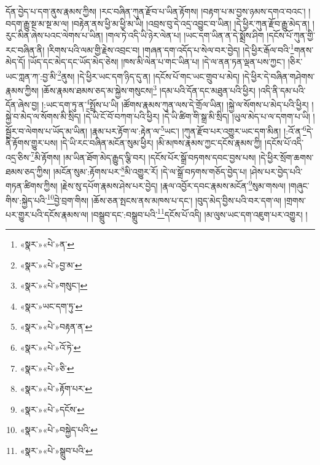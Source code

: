 དོན་བྱེད་པ་དག་ནུས་རྣམས་ཀྱིས། །རང་བཞིན་ཀུན་རྫོབ་པ་ཡིན་རྟོགས། །བརྟག་པ་མ་བྱས་ཉམས་དགའ་བའང་། །བདག་རྒྱུ་སྔ་མ་སྔ་མ་ལ། །བརྟེན་ནས་ཕྱི་མ་ཕྱི་མ་ཡི། །འབྲས་བུ་དེ་འདྲ་འབྱུང་བ་ཡིན། །དེ་ཕྱིར་ཀུན་རྫོབ་རྒྱུ་མེད་ན། །རུང་མིན་ཞེས་པའང་ལེགས་པ་ཡིན། །གལ་ཏེ་འདི་ཡི་ཉེར་ལེན་པ། །ཡང་དག་ཡིན་ན་དེ་སྨྲོས་ཤིག །དངོས་པོ་ཀུན་གྱི་རང་བཞིན་ནི། །རིགས་པའི་ལམ་གྱི་རྗེས་འབྲང་བ། །གཞན་དག་འདོད་པ་སེལ་བར་བྱེད། །དེ་ཕྱིར་རྒོལ་བའི་\footnote{«སྣར་»«པེ་»ན་}གནས་མེད་དོ། །ཡོད་དང་མེད་དང་ཡོད་མེད་ཅེས། །ཁས་མི་ལེན་པ་གང་ཡིན་པ། །དེ་ལ་ནན་ཏན་ལྡན་པས་ཀྱང་། །ཅིར་ཡང་ཀླན་ཀ་:བྱ་མི་\footnote{«སྣར་»«པེ་»བྱ་མ་}ནུས། །དེ་ཕྱིར་ཡང་དག་ཉིད་དུ་ན། །དངོས་པོ་གང་ཡང་གྲུབ་པ་མེད། །དེ་ཕྱིར་དེ་བཞིན་གཤེགས་རྣམས་ཀྱིས། །ཆོས་རྣམས་ཐམས་ཅད་མ་སྐྱེས་གསུངས།\footnote{«སྣར་»«པེ་»གསུང་།} །དམ་པའི་དོན་དང་མཐུན་པའི་ཕྱིར། །འདི་ནི་དམ་པའི་དོན་ཞེས་བྱ། །:ཡང་དག་ཏུ་ན་\footnote{«སྣར་»ཡང་དག་ཏུ་}སྤྲོས་པ་ཡི། །ཚོགས་རྣམས་ཀུན་ལས་དེ་གྲོལ་ཡིན། །སྐྱེ་ལ་སོགས་པ་མེད་པའི་ཕྱིར། །སྐྱེ་བ་མེད་ལ་སོགས་མི་སྲིད། །དེ་ཡི་ངོ་བོ་བཀག་པའི་ཕྱིར། །དེ་ཡི་ཚིག་གི་སྒྲ་མི་སྲིད། །ཡུལ་མེད་པ་ལ་དགག་པ་ཡི། །སྦྱོར་བ་ལེགས་པ་ཡོད་མ་ཡིན། །རྣམ་པར་རྟོག་ལ་:རྟེན་ལ་\footnote{«སྣར་»«པེ་»བརྟན་ན་}ཡང་། །ཀུན་རྫོབ་པར་འགྱུར་ཡང་དག་མིན། །:འོ་ན་\footnote{«སྣར་»«པེ་»འོ་ཏེ་}དེ་ནི་རྟོགས་གྱུར་པས། །དེ་ཡི་རང་བཞིན་མངོན་སུམ་ཕྱིར། །མི་མཁས་རྣམས་ཀྱང་དངོས་རྣམས་ཀྱི། །དངོས་པོ་འདི་འདྲ་ཅིས་\footnote{«སྣར་»«པེ་»ཅི་}མི་རྟོགས། །མ་ཡིན་ཐོག་མེད་རྒྱུད་ལྕི་བར། །དངོས་པོར་སྒྲོ་བཏགས་དབང་བྱས་པས། །དེ་ཕྱིར་སྲོག་ཆགས་ཐམས་ཅད་ཀྱིས། །མངོན་སུམ་:རྟོགས་པར་\footnote{«སྣར་»«པེ་»རྟོག་པར་}མི་འགྱུར་རོ། །དེ་ལ་སྒྲོ་བཏགས་གཅོད་བྱེད་པ། །ཤེས་པར་བྱེད་པའི་གཏན་ཚིགས་ཀྱིས། །རྗེས་སུ་དཔོག་རྣམས་ཤེས་པར་བྱེད། །རྣལ་འབྱོར་དབང་རྣམས་མངོན་\footnote{«སྣར་»«པེ་»དངོས་}སུམ་གསལ། །གཞུང་གིས་:སྐྱེད་པའི་\footnote{«སྣར་»«པེ་»བསྐྱེད་པའི་}བྱེ་བྲག་གིས། །ཆོས་ཅན་སྤངས་ནས་མཁས་པ་དང་། །བུད་མེད་བྱིས་པའི་བར་དག་ལ། །གྲགས་པར་གྱུར་པའི་དངོས་རྣམས་ལ། །བསྒྲུབ་དང་:བསྒྲུབ་པའི་\footnote{«སྣར་»«པེ་»སྒྲུབ་པའི་}དངོས་པོ་འདི། །མ་ལུས་ཡང་དག་འཇུག་པར་འགྱུར། །
